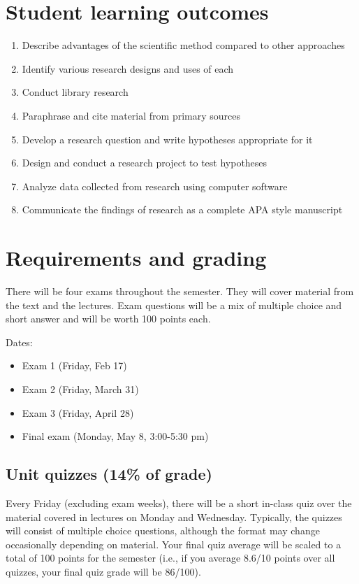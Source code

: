 \documentclass[10pt]{article}
\begin{document}
\section*{Student learning outcomes}
\label{sec-4}

\begin{enumerate}
\item Describe advantages of the scientific method compared to other approaches
\item Identify various research designs and uses of each
\item Conduct library research
\item Paraphrase and cite material from primary sources
\item Develop a research question and write hypotheses appropriate for it
\item Design and conduct a research project to test hypotheses
\item Analyze data collected from research using computer software
\item Communicate the findings of research as a complete APA style manuscript
\end{enumerate}

\section*{Requirements and grading}
\label{sec-5}

There will be four exams throughout the semester.  They will cover material from the text and the lectures.  Exam questions will be a mix of multiple choice and short answer and will be worth 100 points each.

Dates:

\begin{itemize}
\item Exam 1 (Friday, Feb 17)
\item Exam 2 (Friday, March 31)
\item Exam 3 (Friday, April 28)
\item Final exam (Monday, May 8, 3:00-5:30 pm)
\end{itemize}

\subsection*{Unit quizzes (14\% of grade)}
\label{sec-5-1}

Every Friday (excluding exam weeks), there will be a short in-class quiz over the material covered in lectures on Monday and Wednesday. Typically, the quizzes will consist of multiple choice questions, although the format may change occasionally depending on material.  Your final quiz average will be scaled to a total of 100 points for the semester (i.e., if you average 8.6/10 points over all quizzes, your final quiz grade will be 86/100).
\end{document}
